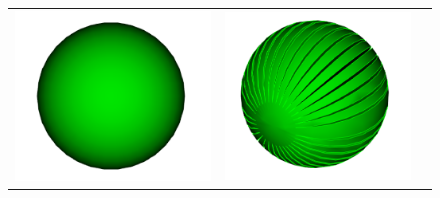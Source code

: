 \documentclass[12pt, a4paper]{article}
\begin{document}
\begin{figure}[H]
  \begin{center}
    \begin{tabular}{ccc}
      \includegraphics[scale=0.13]{sphere.png} &
      \includegraphics[scale=0.13]{ds.png} &

\end{tabular}
\end{center}
\end{figure}
\end{document}
